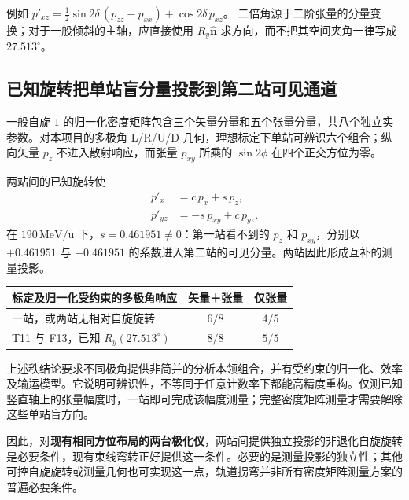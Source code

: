 \documentclass[UTF8,11pt,a4paper,fontset=none]{ctexart}
\begin{document}
例如 $p'_{xz}=\tfrac12\sin2\delta\,(p_{zz}-p_{xx})+\cos2\delta\,p_{xz}$。
二倍角源于二阶张量的分量变换；对于一般倾斜的主轴，应直接使用 $R_y\hat{\bm n}$ 求方向，而不把其空间夹角一律写成 $27.513^\circ$。

\clearpage
\subsection{已知旋转把单站盲分量投影到第二站可见通道}

一般自旋 $1$ 的归一化密度矩阵包含三个矢量分量和五个张量分量，共八个独立实参数。对本项目的多极角 L/R/U/D 几何，理想标定下单站可辨识六个组合；纵向矢量 $p_z$ 不进入散射响应，而张量 $p_{xy}$ 所乘的 $\sin2\phi$ 在四个正交方位为零\cite{local}。

两站间的已知旋转使
\begin{align}
 p'_x&=c\,p_x+s\,p_z,\\
 p'_{yz}&=-s\,p_{xy}+c\,p_{yz}.
\end{align}
在 $190\,\mathrm{MeV/u}$ 下，$s=0.461951\ne0$：第一站看不到的 $p_z$ 和 $p_{xy}$，分别以 $+0.461951$ 与 $-0.461951$ 的系数进入第二站的可见分量。两站因此形成互补的测量投影。

\begin{center}
\begin{tabular}{@{}lcc@{}}
\toprule
标定及归一化受约束的多极角响应 & 矢量＋张量 & 仅张量 \\
\midrule
一站，或两站无相对自旋旋转 & $6/8$ & $4/5$ \\
T11 与 F13，已知 $R_y(27.513^\circ)$ & $8/8$ & $5/5$ \\
\bottomrule
\end{tabular}
\end{center}

上述秩结论要求不同极角提供非简并的分析本领组合，并有受约束的归一化、效率及输运模型。它说明可辨识性，不等同于任意计数率下都能高精度重构。仅测已知竖直轴上的张量幅度时，一站即可完成该幅度测量；完整密度矩阵测量才需要解除这些单站盲方向。

因此，对\textbf{现有相同方位布局的两台极化仪}，两站间提供独立投影的非退化自旋旋转是必要条件，现有束线弯转正好提供这一条件。必要的是测量投影的独立性；其他可控自旋旋转或测量几何也可实现这一点，轨道拐弯并非所有密度矩阵测量方案的普遍必要条件。
\end{document}

